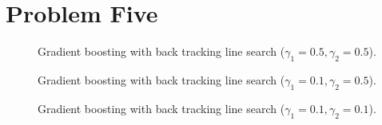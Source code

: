 

\section{Problem Five}

\begin{figure}[h!tbp]
       \caption{Gradient boosting with back tracking line search ($\gamma_1=0.5, \gamma_2=0.5$).}
\end{figure}

\begin{figure}[h!tbp]
       \caption{Gradient boosting with back tracking line search ($\gamma_1=0.1, \gamma_2=0.5$).}
\end{figure}

\begin{figure}[h!tbp]
       \caption{Gradient boosting with back tracking line search ($\gamma_1=0.1, \gamma_2=0.1$).}
\end{figure}

